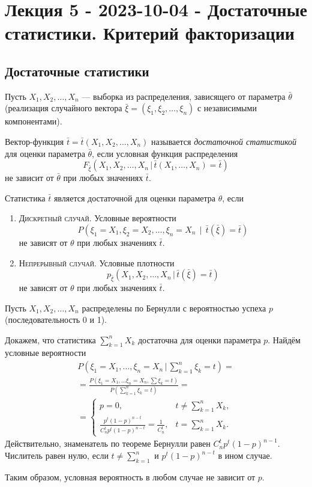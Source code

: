 \chapter{Лекция 5 - 2023-10-04 - Достаточные статистики. Критерий факторизации}
\section{Достаточные статистики}
Пусть $ X_1, X_2, \ldots, X_n $ --- выборка из распределения, зависящего от
параметра $ \bar \theta $ (реализация случайного вектора $ \bar \xi = (\xi_1,
\xi_2, \ldots, \xi_n) $ с независимыми компонентами).

\begin{definition}
  Вектор-функция $\bar t = \bar t(X_1, X_2, \dots, X_n)$ называется \emph{достаточной
	статистикой} для оценки параметра $\bar{\theta}$, если условная функция
	распределения
	\[
		F_{\bar \xi} (X_1, X_2, \dots, X_n\, | \,\bar{t} (X_1, \dots, X_n)
		= \bar t)
	\]
	не зависит от $\bar\theta$ при любых значениях $\bar t$. 
\end{definition}

\begin{remark*}
Статистика $ \bar t $ является достаточной для оценки параметра $ \theta $, если
\begin{enumerate}
	\item \textsc{Дискретный случай}. Условные вероятности 
	\[
			P(\xi_1 = X_1, \xi_2 = X_2, \ldots, \xi_n = X_n\, \mid \, \bar t(\bar \xi) = \bar
			t)
	\]
	не зависят от $ \theta $ при любых значениях $ \bar t $.
\item \textsc{Непрерывный случай}. Условные плотности  
\[
	p_{\bar \xi} (X_1, X_2, \ldots, X_n\, |\,\bar t(\bar \xi) = \bar t)
\]
не зависят от $ \theta $ при любых значениях $ \bar t $.
\end{enumerate}

\end{remark*}

\begin{ex}
  Пусть $X_1, X_2, \dots, X_n$ распределены по Бернулли с вероятностью успеха $p$
	(последовательность 0 и 1).

	Докажем, что статистика $\sum_{k=1}^n X_k$ достаточна для оценки параметра $p$.
Найдём условные вероятности
  \begin{multline*}
		P\left(\xi_1 = X_1, \dots, \xi_n = X_n\,\Big|\, \sum_{k=1}^n \xi_k =
		t\right) = \\
		= \frac{P(\xi_1 = X_1, \dots \xi_n = X_n, \sum \xi_k = t)}{P\left(\sum_{k=1}^n \xi_k = t\right)} = \\
    = \begin{cases}
			p = 0, &t \neq \sum_{k=1}^n X_k, \\
      \frac{ p^t (1-p)^{n-t} }{ C_n^t p^t (1-p)^{n-t} } = \frac{1}{C_n^t}, &t
			= \sum_{k=1}^n X_k.
    \end{cases}
  \end{multline*}
	Действительно, знаменатель по теореме Бернулли равен $ C^t_n p^t(1-p)^{n-1} $.
	Числитель равен нулю, если $ t \ne \sum_{k=1}^n $ и $ p^t(1-p)^{n-t} $ в ином
	случае.

	Таким образом, условная вероятность в любом случае не зависит от $ p $.
\end{ex}

